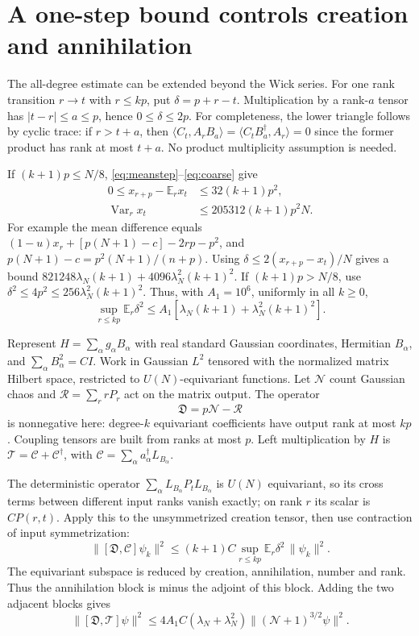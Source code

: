 \documentclass[11pt,a4paper]{article}
\newcommand{\EE}{\mathbb E}
\begin{document}
\newpage
\section{A one-step bound controls creation and annihilation}
The all-degree estimate can be extended beyond the Wick series.
For one rank transition $r\to t$ with $r\le kp$, put
$\delta=p+r-t$. Multiplication by a rank-$a$ tensor has
$|t-r|\le a\le p$, hence $0\le\delta\le2p$.
For completeness, the lower triangle follows by cyclic trace:
if $r>t+a$, then $\langle C_t,A_rB_a\rangle
=\langle C_tB_a^\dagger,A_r\rangle=0$ since the former product
has rank at most $t+a$. No product multiplicity assumption is needed.

If $(k+1)p\le N/8$, \eqref{eq:meanstep}--\eqref{eq:coarse} give
\begin{align}
 0\le x_{r+p}-\EE_r x_t&\le32(k+1)p^2,\\
 \operatorname{Var}_r x_t&\le205312(k+1)p^2N.
\end{align}
For example the mean difference equals
$(1-u)x_r+[p(N+1)-c]-2rp-p^2$, and
$p(N+1)-c=p^2(N+1)/(n+p)$.
Using $\delta\le2(x_{r+p}-x_t)/N$ gives a bound
$821248\lambda_N(k+1)+4096\lambda_N^2(k+1)^2$.
If $(k+1)p>N/8$, use $\delta^2\le4p^2\le256\lambda_N^2(k+1)^2$.
Thus, with $A_1=10^6$, uniformly in all $k\ge0$,
\begin{equation}
 \sup_{r\le kp}\EE_r\delta^2
 \le A_1[\lambda_N(k+1)+\lambda_N^2(k+1)^2].\label{eq:step}
\end{equation}

Represent $H=\sum_\alpha g_\alpha B_\alpha$ with real standard
Gaussian coordinates, Hermitian $B_\alpha$, and
$\sum_\alpha B_\alpha^2=CI$. Work in Gaussian $L^2$ tensored with
the normalized matrix Hilbert space, restricted to $U(N)$-equivariant
functions. Let $\mathcal N$ count Gaussian chaos and
$\mathcal R=\sum_r rP_r$ act on the matrix output. The operator
\begin{equation}
 \mathfrak D=p\mathcal N-\mathcal R
\end{equation}
is nonnegative here: degree-$k$ equivariant coefficients have output
rank at most $kp$. Coupling tensors are built from ranks at most $p$.
Left multiplication by $H$ is
$\mathcal T=\mathcal C+\mathcal C^\dagger$, with
$\mathcal C=\sum_\alpha a_\alpha^\dagger L_{B_\alpha}$.

The deterministic operator
$\sum_\alpha L_{B_\alpha}P_tL_{B_\alpha}$ is $U(N)$ equivariant,
so its cross terms between different input ranks vanish exactly;
on rank $r$ its scalar is $CP(r,t)$. Apply this to the unsymmetrized
creation tensor, then use contraction of input symmetrization:
\begin{equation}
 \|[\mathfrak D,\mathcal C]\psi_k\|^2
 \le(k+1)C\sup_{r\le kp}\EE_r\delta^2\,\|\psi_k\|^2.
\end{equation}
The equivariant subspace is reduced by creation, annihilation,
number and rank. Thus the annihilation block is minus the adjoint
of this block. Adding the two adjacent blocks gives
\begin{equation}
 \|[\mathfrak D,\mathcal T]\psi\|^2
 \le4A_1C(\lambda_N+\lambda_N^2)
       \|(\mathcal N+1)^{3/2}\psi\|^2.\label{eq:commbound}
\end{equation}
\end{document}
